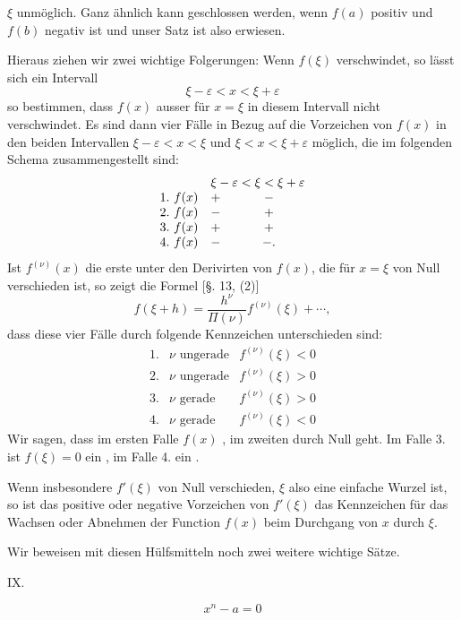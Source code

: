 
$\xi$ unmöglich. Ganz ähnlich kann geschlossen werden, wenn $f(a)$ positiv und $f(b)$ negativ ist und unser Satz ist also erwiesen.

Hieraus ziehen wir zwei wichtige Folgerungen: Wenn $f(\xi)$ verschwindet, so lässt sich ein Intervall
\[
 \xi-\varepsilon<x<\xi+\varepsilon
\]
so bestimmen, dass $f(x)$ ausser für $x=\xi$ in diesem Intervall nicht verschwindet. Es sind dann vier Fälle in Bezug auf die Vorzeichen von $f(x)$ in den beiden Intervallen $\xi-\varepsilon<x<\xi$ und $\xi<x<\xi+\varepsilon$ möglich, die im folgenden Schema zusammengestellt sind:
\[
\begin{array}{lcc}
&\multicolumn{2}{c}{\xi-\varepsilon<\xi<\xi+\varepsilon}\\
1.\ f(x)&+&-\\
2.\ f(x)&-&+\\
3.\ f(x)&+&+\\
4.\ f(x)&-&-.
\end{array}
\]
Ist $f^{(\nu)}(x)$ die erste unter den Derivirten von $f(x)$, die für $x=\xi$ von Null verschieden ist, so zeigt die Formel [§. 13, (2)]
\[
 f(\xi+h)=\frac{h^\nu}{\Pi(\nu)}f^{(\nu)}(\xi)+\cdots,
\]
dass diese vier Fälle durch folgende Kennzeichen unterschieden sind:
\[
\begin{array}{lll}
1.&\nu\text{ ungerade}& f^{(\nu)}(\xi)<0\\
2.&\nu\text{ ungerade}& f^{(\nu)}(\xi)>0\\
3.&\nu\text{ gerade}& f^{(\nu)}(\xi)>0\\
4.&\nu\text{ gerade}& f^{(\nu)}(\xi)<0
\end{array}
\]
Wir sagen, dass im ersten Falle $f(x)$ , im zweiten  durch Null geht. Im Falle 3. ist $f(\xi)=0$ ein , im Falle 4. ein .

Wenn insbesondere $f'(\xi)$ von Null verschieden, $\xi$ also eine einfache Wurzel ist, so ist das positive oder negative Vorzeichen von $f'(\xi)$ das Kennzeichen für das Wachsen oder Abnehmen der Function $f(x)$ beim Durchgang von $x$ durch $\xi$.

Wir beweisen mit diesen Hülfsmitteln noch zwei weitere wichtige Sätze.

\medskip
\noindent IX. \par
\[
 x^n-a=0
\]
\par
\medskip
